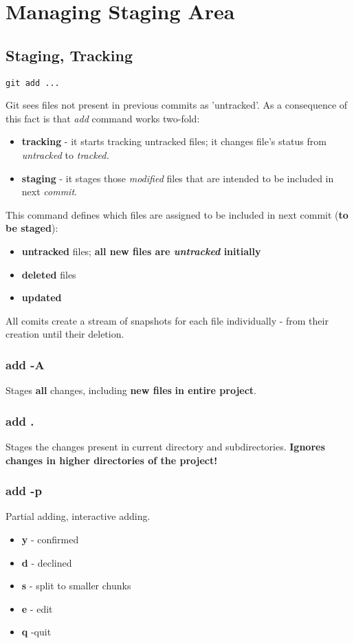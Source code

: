 \documentclass{report}
\begin{document}
\chapter{Managing Staging Area}


\section{Staging, Tracking}
\begin{verbatim}
git add ...
\end{verbatim}
Git sees files not present in previous commits as 'untracked'. As a consequence of this fact is that \textit{add} command works two-fold:
\begin{itemize}
	\item \textbf{tracking} - it starts tracking untracked files; it changes file's status from \textit{untracked} to \textit{tracked.}
	\item \textbf{staging} - it stages those \textit{modified} files that are intended to be included in next \textit{commit}.
\end{itemize}

This command defines which files are assigned to be included in next commit (\textbf{to be staged}):
\begin{itemize}
	\item \textbf{untracked} files; \textbf{all new files are \textit{untracked} initially}
	\item \textbf{deleted} files
	\item \textbf{updated}
\end{itemize}
All comits create a stream of snapshots for each file individually - from their creation until their deletion.

\subsection{add -A}
Stages \textbf{all} changes, including \textbf{new files} \textbf{in entire project}.

\subsection{add .}
Stages the changes present in current directory and subdirectories. \textbf{Ignores changes in higher directories of the project!}

\subsection{add -p}
Partial adding, interactive adding.
\begin{itemize}
	\item \textbf{y} - confirmed
	\item \textbf{d} - declined
	\item \textbf{s} - split to smaller chunks
	\item \textbf{e} - edit
	\item \textbf{q} -quit
\end{itemize}
\end{document}

